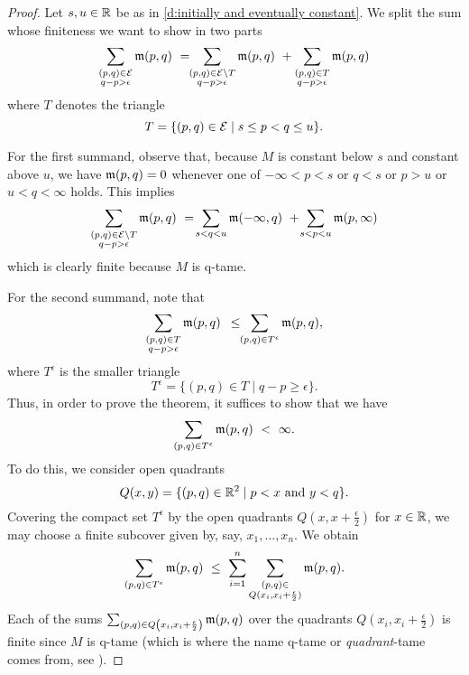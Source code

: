 \begin{proof}
	Let $s, u \in \mathbb{R}$ be as in \cref{d:initially and eventually constant}.
	We split the sum whose finiteness we want to show in two parts
	\begin{equation*}
	\sum_{ \substack{ (p,q) \in \mathcal{E} \\ q-p > \epsilon } } \mathfrak{m} (p,q) \ = \!\!
	\sum_{ \substack{ (p,q) \in \mathcal{E} \setminus T \\ q-p > \epsilon } } \mathfrak{m} (p,q) \ +
	\sum_{ \substack{ (p,q) \in T \\ q-p > \epsilon } } \mathfrak{m} (p,q)
	\end{equation*}
	where $T$ denotes the triangle
	\begin{equation*}
	T = \{(p,q) \in \mathcal{E} \mid s \leq p < q \leq u\}.
	\end{equation*}

	For the first summand, observe that, because $M$ is constant below $s$ and constant above $u$, we have $\mathfrak{m}(p,q) = 0$ whenever one of $-\infty < p < s$ or $q < s$ or $p > u$ or $u < q < \infty$ holds.
	This implies
	\begin{equation*}
	\sum_{ \substack{ (p,q) \in \mathcal{E} \setminus T \\ q-p > \epsilon } } \mathfrak{m} (p,q)
	\ = \!
	\sum_{s < q < u} \mathfrak{m} (-\infty,q)
	\ + \!
	\sum_{s < p < u} \mathfrak{m} (p, \infty)
	\end{equation*}
	which is clearly finite because $M$ is q-tame.

	For the second summand, note that
	\begin{equation*}
	\sum_{ \substack{ (p,q) \in T \\ q-p > \epsilon } } \mathfrak{m} (p,q)
	\ \, \leq \!\!
	\sum_{(p,q) \in T^{\epsilon}} \mathfrak{m} (p,q),
	\end{equation*}
	where $T^{\epsilon}$ is the smaller triangle
	\begin{equation*}
	T^{\epsilon} = \{(p,q) \in T \mid q-p \geq \epsilon\}.
	\end{equation*}
	Thus, in order to prove the theorem, it suffices to show that we have
	\begin{equation*}
	\sum_{(p,q) \in T^{\epsilon}} \mathfrak{m} (p,q)
	\ < \
	\infty.
	\end{equation*}
	To do this, we consider open quadrants
	\begin{equation*}
	Q(x, y) = \{ (p, q) \in \mathbb{R}^2 \mid p < x \text{ and } y < q \}.
	\end{equation*}
	Covering the compact set $T^{\epsilon}$ by the open quadrants $Q \left(x, x + \frac{\epsilon}{2} \right)$ for $x \in \mathbb{R}$, we may choose a finite subcover given by, say, $x_1,\dots, x_n$.
	We obtain
	\begin{equation*}
	\sum_{(p,q) \in T^{\epsilon}} \mathfrak{m} (p,q)
	\ \leq \
	\sum_{i=1}^n \sum_{\substack{(p, q) \in \\ Q (x_i, x_i + \frac{\epsilon}{2})}} \mathfrak{m}(p,q).
	\end{equation*}
	Each of the sums $\sum_{(p,q) \in Q \left(x_i, x_i + \frac{\epsilon}{2} \right)} \mathfrak{m}(p,q)$ over the quadrants $Q \left(x_i, x_i + \frac{\epsilon}{2} \right)$ is finite since $M$ is q-tame (which is where the name q-tame or \emph{quadrant}-tame comes from, see \cite[Section 3.8]{Chazal.2016a}).
\end{proof}

